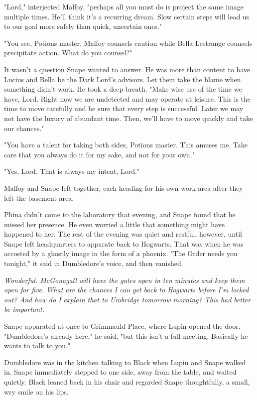 "Lord," interjected Malfoy, "perhaps all you must do is project the same image multiple times. He'll think it's a recurring dream. Slow certain steps will lead us to our goal more safely than quick, uncertain ones."

"You see, Potions master, Malfoy counsels caution while Bella Lestrange counsels precipitate action. What do you counsel?"

It wasn't a question Snape wanted to answer. He was more than content to have Lucius and Bella be the Dark Lord's advisors. Let them take the blame when something didn't work. He took a deep breath. "Make wise use of the time we have, Lord. Right now we are undetected and may operate at leisure. This is the time to move carefully and be sure that every step is successful. Later we may not have the luxury of abundant time. Then, we'll have to move quickly and take our chances."

"You have a talent for taking both sides, Potions master. This amuses me. Take care that you always do it for my sake, and not for your own."

"Yes, Lord. That is always my intent, Lord."

Malfoy and Snape left together, each heading for his own work area after they left the basement area.

Phina didn't come to the laboratory that evening, and Snape found that he missed her presence. He even worried a little that something might have happened to her. The rest of the evening was quiet and restful, however, until Snape left headquarters to apparate back to Hogwarts. That was when he was accosted by a ghostly image in the form of a phoenix. "The Order needs you tonight," it said in Dumbledore's voice, and then vanished.

\emph{Wonderful. McGonagall will have the gates open in ten minutes and keep them open for five. What are the chances I can get back to Hogwarts before I'm locked out? And how do I explain that to Umbridge tomorrow morning? This had better be important.}

Snape apparated at once to Grimmauld Place, where Lupin opened the door. "Dumbledore's already here," he said, "but this isn't a full meeting. Basically he wants to talk to you."

Dumbledore was in the kitchen talking to Black when Lupin and Snape walked in. Snape immediately stepped to one side, away from the table, and waited quietly. Black leaned back in his chair and regarded Snape thoughtfully, a small, wry smile on his lips.

